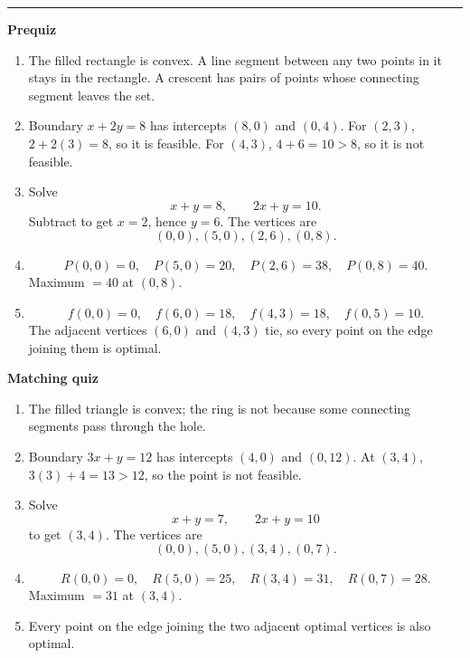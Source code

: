 \documentclass[10pt]{article}
\newcommand{\modulekey}[2]{\clearpage{\Large\bfseries\textcolor{olive}{Module #1: #2 — Answer Key}}\par\textcolor{gold}{\rule{\linewidth}{1.2pt}}\par}
\begin{document}
\modulekey{8}{Convex Geometry}
\textbf{Prequiz}
\begin{enumerate}
\item The filled rectangle is convex. A line segment between any two points in it stays in the rectangle. A crescent has pairs of points whose connecting segment leaves the set.
\item Boundary \(x+2y=8\) has intercepts \(\boxed{(8,0)}\) and \(\boxed{(0,4)}\). For \((2,3)\), \(2+2(3)=8\), so it is feasible. For \((4,3)\), \(4+6=10>8\), so it is not feasible.
\item Solve
\[
x+y=8,
\qquad 2x+y=10.
\]
Subtract to get \(x=2\), hence \(y=6\). The vertices are
\[
\boxed{(0,0),(5,0),(2,6),(0,8)}.
\]
\item
\[
P(0,0)=0,\quad P(5,0)=20,\quad P(2,6)=38,\quad P(0,8)=40.
\]
Maximum \(=\boxed{40}\) at \(\boxed{(0,8)}\).
\item
\[
f(0,0)=0,\quad f(6,0)=18,\quad f(4,3)=18,\quad f(0,5)=10.
\]
The adjacent vertices \((6,0)\) and \((4,3)\) tie, so every point on the edge joining them is optimal.
\end{enumerate}

\textbf{Matching quiz}
\begin{enumerate}
\item The filled triangle is convex; the ring is not because some connecting segments pass through the hole.
\item Boundary \(3x+y=12\) has intercepts \(\boxed{(4,0)}\) and \(\boxed{(0,12)}\). At \((3,4)\), \(3(3)+4=13>12\), so the point is not feasible.
\item Solve
\[
x+y=7,
\qquad 2x+y=10
\]
to get \((3,4)\). The vertices are
\[
\boxed{(0,0),(5,0),(3,4),(0,7)}.
\]
\item
\[
R(0,0)=0,\quad R(5,0)=25,\quad R(3,4)=31,\quad R(0,7)=28.
\]
Maximum \(=\boxed{31}\) at \(\boxed{(3,4)}\).
\item Every point on the edge joining the two adjacent optimal vertices is also optimal.
\end{enumerate}
\end{document}
